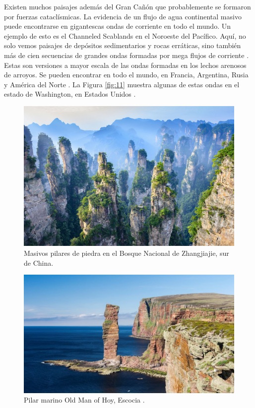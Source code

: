 \documentclass[10pt,twocolumn,letterpaper]{article}
\begin{document}
Existen muchos paisajes además del Gran Cañón que probablemente se formaron por fuerzas cataclísmicas. La evidencia de un flujo de agua continental masivo puede encontrarse en gigantescas ondas de corriente en todo el mundo. Un ejemplo de esto es el Channeled Scablands en el Noroeste del Pacífico. Aquí, no solo vemos paisajes de depósitos sedimentarios y rocas erráticas, sino también más de cien secuencias de grandes ondas formadas por mega flujos de corriente \cite{78,79}. Estas son versiones a mayor escala de las ondas formadas en los lechos arenosos de arroyos. Se pueden encontrar en todo el mundo, en Francia, Argentina, Rusia y América del Norte \cite{81}. La Figura \ref{fig:11} muestra algunas de estas ondas en el estado de Washington, en Estados Unidos \cite{80}.

\begin{figure}[b]
\begin{center}
   \includegraphics[width=1\linewidth]{zhangjiajie.jpg}
\end{center}
   \caption{Masivos pilares de piedra en el Bosque Nacional de Zhangjiajie, sur de China.}
\label{fig:12}
\label{fig:onecol}
\end{figure}

\begin{figure}[t]
\begin{center}
   \includegraphics[width=1\linewidth]{hoy.jpg}
\end{center}
   \caption{Pilar marino Old Man of Hoy, Escocia \cite{83}.}
\label{fig:13}
\label{fig:onecol}
\end{figure}
\end{document}
